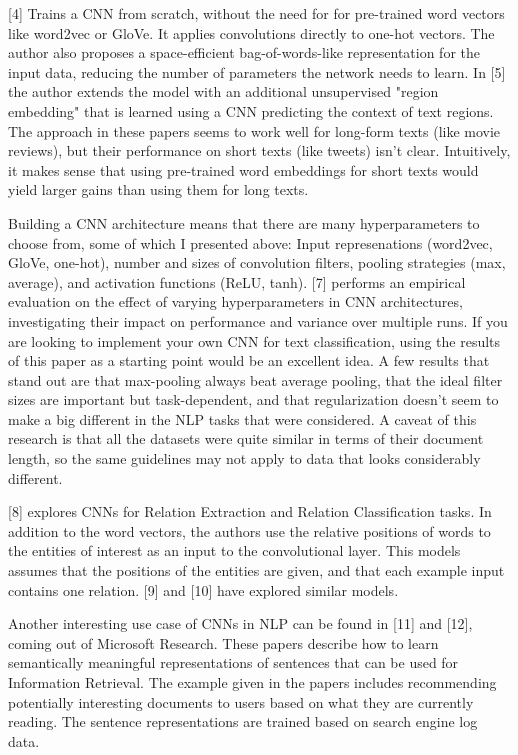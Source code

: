 \documentclass[UTF8,11pt,a4paper]{ctexart}
\begin{document}
[4] Trains a CNN from scratch, without the need for for pre-trained word vectors like word2vec or GloVe. It applies convolutions directly to one-hot vectors. The author also proposes a space-efficient bag-of-words-like representation for the input data, reducing the number of parameters the network needs to learn. In [5] the author extends the model with an additional unsupervised "region embedding" that is learned using a CNN predicting the context of text regions. The approach in these papers seems to work well for long-form texts (like movie reviews), but their performance on short texts (like tweets) isn't clear. Intuitively, it makes sense that using pre-trained word embeddings for short texts would yield larger gains than using them for long texts.

Building a CNN architecture means that there are many hyperparameters to choose from, some of which I presented above: Input represenations (word2vec, GloVe, one-hot), number and sizes of convolution filters, pooling strategies (max, average), and activation functions (ReLU, tanh). [7] performs an empirical evaluation on the effect of varying hyperparameters in CNN architectures, investigating their impact on performance and variance over multiple runs. If you are looking to implement your own CNN for text classification, using the results of this paper as a starting point would be an excellent idea. A few results that stand out are that max-pooling always beat average pooling, that the ideal filter sizes are important but task-dependent, and that regularization doesn't seem to make a big different in the NLP tasks that were considered. A caveat of this research is that all the datasets were quite similar in terms of their document length, so the same guidelines may not apply to data that looks considerably different.

[8] explores CNNs for Relation Extraction and Relation Classification tasks. In addition to the word vectors, the authors use the relative positions of words to the entities of interest as an input to the convolutional layer. This models assumes that the positions of the entities are given, and that each example input contains one relation. [9] and [10] have explored similar models.

Another interesting use case of CNNs in NLP can be found in [11] and [12], coming out of Microsoft Research. These papers describe how to learn semantically meaningful representations of sentences that can be used for Information Retrieval. The example given in the papers includes recommending potentially interesting documents to users based on what they are currently reading. The sentence representations are trained based on search engine log data.
\end{document}
